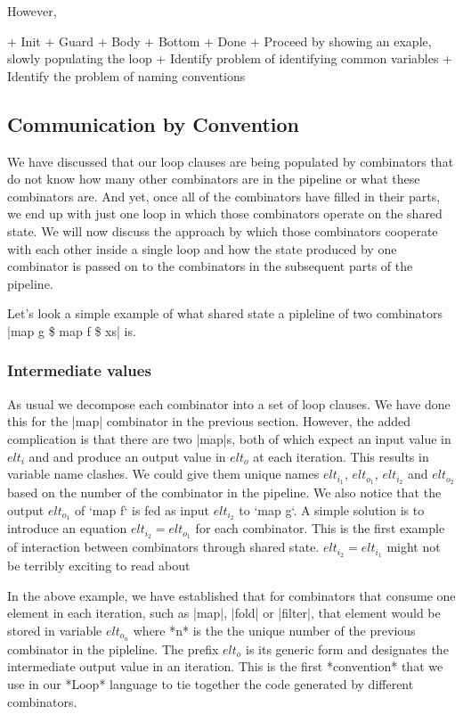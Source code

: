 However, 

+ Init
+ Guard
+ Body
+ Bottom
+ Done
+ Proceed by showing an exaple, slowly populating the loop
+ Identify problem of identifying common variables
+ Identify the problem of naming conventions


\subsection{Communication by Convention}

We have discussed that our loop clauses are being populated by combinators that do not know how many other combinators are in the pipeline or what these combinators are. And yet, once all of the combinators have filled in their parts, we end up with just one loop in which those combinators operate on the shared state. We will now discuss the approach by which those combinators cooperate with each other inside a single loop and how the state produced by one combinator is passed on to the combinators in the subsequent parts of the pipeline.

Let's look a simple example of what shared state a pipleline of two combinators |map g \$ map f \$ xs| is.


\subsubsection{Intermediate values}

As usual we decompose each combinator into a set of loop clauses. We have done this for the |map| combinator in the previous section. However, the added complication is that there are two |map|s, both of which expect an input value in $elt_i$ and and produce an output value in $elt_o$ at each iteration. This results in variable name clashes. We could give them unique names $elt_{i_1}$, $elt_{o_1}$, $elt_{i_2}$ and $elt_{o_2}$ based on the number of the combinator in the pipeline. We also notice that the output $elt_{o_1}$ of `map f` is fed as input $elt_{i_2}$ to `map g`. A simple solution is to introduce an equation $elt_{i_2} = elt_{o_1}$ for each combinator. This is the first example of interaction between combinators through shared state.
 $elt_{i_2} = elt_{i_1}$ might not be terribly exciting to read about

In the above example, we have established that for combinators that consume one element in each iteration, such as |map|, |fold| or |filter|, that element would be stored in variable $elt_{o_n}$ where *n* is the the unique number of the previous combinator in the pipleline. The prefix $elt_o$ is its generic form and designates the intermediate output value in an iteration. This is the first *convention* that we use in our *Loop* language to tie together the code generated by different combinators.

